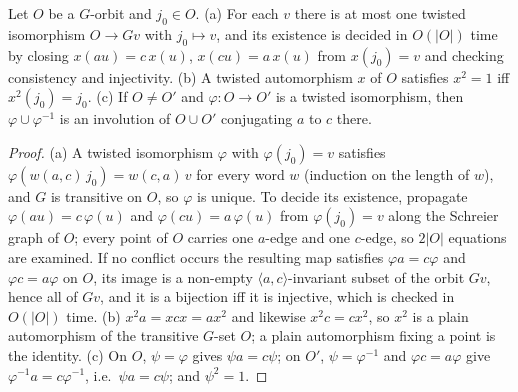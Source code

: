 \documentclass[preprint,12pt]{elsarticle}
\theoremstyle{definition}\newtheorem{defi}[thm]{Definition}\newtheorem{prob}[thm]{Problem}\newtheorem{obs}[thm]{Observation}
\theoremstyle{remark}\newtheorem{rem}[thm]{Remark}
\begin{document}
\begin{lem}\label{lem:inv2}
Let $O$ be a $G$-orbit and $j_0\in O$. (a) For each $v$ there is at most one twisted isomorphism $O\to Gv$ with $j_0\mapsto v$, and its existence is
decided in $O(|O|)$ time by closing $x(au)=c\,x(u)$, $x(cu)=a\,x(u)$ from $x(j_0)=v$ and checking consistency and injectivity.
(b) A twisted automorphism $x$ of $O$ satisfies $x^{2}=1$ iff $x^{2}(j_0)=j_0$. (c) If $O\ne O'$ and $\varphi:O\to O'$ is a twisted isomorphism,
then $\varphi\cup\varphi^{-1}$ is an involution of $O\cup O'$ conjugating $a$ to $c$ there.
\end{lem}
\begin{proof}
(a) A twisted isomorphism $\varphi$ with $\varphi(j_0)=v$ satisfies $\varphi(w(a,c)\,j_0)=w(c,a)\,v$ for every word $w$ (induction on the
length of $w$), and $G$ is transitive on $O$, so $\varphi$ is unique. To decide its existence, propagate $\varphi(au)=c\,\varphi(u)$ and
$\varphi(cu)=a\,\varphi(u)$ from $\varphi(j_0)=v$ along the Schreier graph of $O$; every point of $O$ carries one $a$-edge and one $c$-edge,
so $2|O|$ equations are examined. If no conflict occurs the resulting map satisfies $\varphi a=c\varphi$ and $\varphi c=a\varphi$ on $O$,
its image is a non-empty $\langle a,c\rangle$-invariant subset of the orbit $Gv$, hence all of $Gv$, and it is a bijection iff it is
injective, which is checked in $O(|O|)$ time. (b) $x^{2}a=xcx=ax^{2}$ and likewise $x^{2}c=cx^{2}$, so $x^{2}$ is a plain automorphism of the
transitive $G$-set $O$; a plain automorphism fixing a point is the identity. (c) On $O$, $\psi=\varphi$ gives $\psi a=c\psi$; on $O'$,
$\psi=\varphi^{-1}$ and $\varphi c=a\varphi$ give $\varphi^{-1}a=c\varphi^{-1}$, i.e.\ $\psi a=c\psi$; and $\psi^{2}=1$.
\end{proof}
\end{document}
